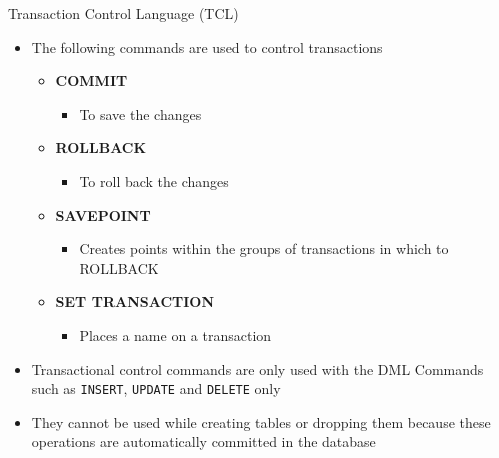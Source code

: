 \documentclass[aspectratio=169, xcolor=dvipsnames]{beamer}
\begin{document}
\begin{frame}{Transaction Control Language (TCL)}
    \begin{itemize}[<+->]
        \item The following commands are used to control transactions
        \begin{itemize}
            \item \textbf{COMMIT}
            \begin{itemize}
                \item[$\triangleright$] To save the changes
            \end{itemize}
            \item \textbf{ROLLBACK}
            \begin{itemize}
                \item[$\triangleright$] To roll back the changes
            \end{itemize}
            \item \textbf{SAVEPOINT}
            \begin{itemize}
                \item[$\triangleright$] Creates points within the groups of transactions in which to ROLLBACK
            \end{itemize}
            \item \textbf{SET TRANSACTION}
            \begin{itemize}
                \item[$\triangleright$] Places a name on a transaction
            \end{itemize}
        \end{itemize}
        \item Transactional control commands are only used with the DML Commands such as \texttt{INSERT}, \texttt{UPDATE} and \texttt{DELETE} only
        \item They cannot be used while creating tables or dropping them because these operations are automatically committed in the database
    \end{itemize}
\end{frame}
\end{document}
